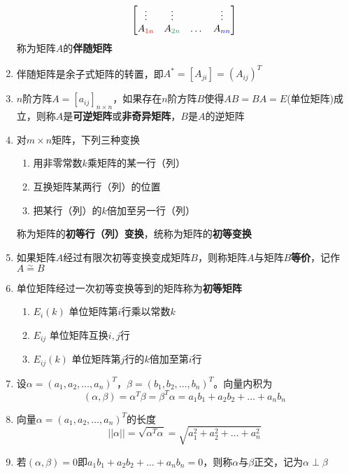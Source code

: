 \documentclass[a4paper,12pt]{article}
\begin{document}
\begin{enumerate}
\[\begin{bmatrix}
                \vdots              & \vdots                                 &       & \vdots                   \\
                A_{\color{red}{1n}} & A_{\textcolor[rgb]{0.2, 0.6, 0.3}{2n}} & \dots & A_{\textcolor{blue}{nn}}
            \end{bmatrix}
        \]
        称为矩阵$A$的\textbf{伴随矩阵}
        \item 伴随矩阵是余子式矩阵的转置，即$A^* = [A_{ji}] = (A_{ij})^T$
        \item $n$阶方阵$A = [a_{ij}]_{n \times n}$，如果存在$n$阶方阵$B$使得$AB = BA = E$(单位矩阵)成立，则称$A$是\textbf{可逆矩阵}或\textbf{非奇异矩阵}，$B$是$A$的逆矩阵
        \item 对$m \times n$矩阵，下列三种变换
        \begin{enumerate}
            \item 用非零常数$k$乘矩阵的某一行（列）
            \item 互换矩阵某两行（列）的位置
            \item 把某行（列）的$k$倍加至另一行（列）
        \end{enumerate}
        称为矩阵的\textbf{初等行（列）变换}，统称为矩阵的\textbf{初等变换}
        \item 如果矩阵$A$经过有限次初等变换变成矩阵$B$，则称矩阵$A$与矩阵$B$\textbf{等价}，记作$A \overset{\sim}{=} B$
        \item 单位矩阵经过一次初等变换等到的矩阵称为\textbf{初等矩阵}
        \begin{enumerate}
            \item $E_{i}(k)$ 单位矩阵第$i$行乘以常数$k$
            \item $E_{ij}$ 单位矩阵互换$i,j$行
            \item $E_{ij}(k)$ 单位矩阵第$j$行的$k$倍加至第$i$行
        \end{enumerate}
        \item 设$\alpha = (a_1, a_2, \dots, a_n)^{T}$，$\beta = (b_1, b_2, \dots, b_n)^{T}$。向量内积为
        \[
            (\alpha, \beta) = \alpha^{T}\beta = \beta^{T}\alpha = a_{1}b_{1} + a_{2}b_{2} + \dots + a_{n}b_{n}
        \]
        \item 向量$\alpha = (a_1, a_2, \dots, a_n)^{T}$的长度
        \[
            ||\alpha|| = \sqrt{\alpha^T\alpha} = \sqrt {a_1^2 + a_2^2 + \dots + a_n^2}
        \]
        \item 若$(\alpha, \beta) = 0$即$a_{1}b_{1} + a_{2}b_{2} + \dots + a_{n}b_{n} = 0$，则称$\alpha$与$\beta$正交，记为$\alpha \perp \beta$

\end{enumerate}
\end{document}
